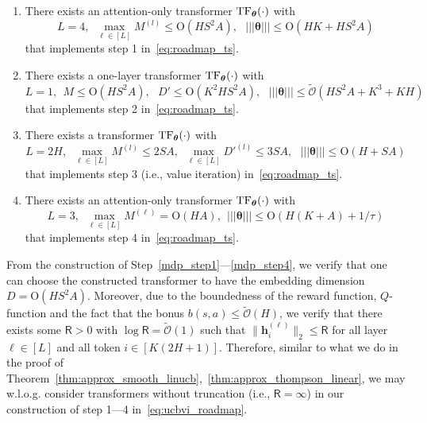 \documentclass[10pt]{article}
\newcommand{\<}{\left\langle}
\renewcommand{\>}{\right\rangle}
\newcommand{\lth}{{(\ell)}}
\newcommand{\TF}{{\rm TF}}
\newcommand{\nrmp}[1]{{\left|\!\left|\!\left|{#1}\right|\!\right|\!\right|}}
\newcommand{\temp}{{\tau}}
\newcommand{\tcO}{{\tilde{\mathcal O}}}
\newcommand{\state}{{s}}
\newcommand{\action}{{a}}
\newcommand{\Numepi}{{K}}
\newcommand{\horizon}{{H}}
\renewcommand{\horizon}{{H}}
\newcommand{\bonus}{{b}}
\newcommand{\tfpar}{{\btheta}}
\newcommand{\layer}{{L}}
\newcommand{\hidden}{{D'}}
\newcommand{\head}{{M}}
\newcommand{\clipval}{{\mathsf{R}}}
\newcommand{\Numst}{{S}}
\newcommand{\Numact}{{A}}
\newcommand{\conO}{{\mathrm{O}}}
\def\btheta{{\boldsymbol \theta}}
\def\bh{{\mathbf h}}
\begin{document}
\begin{enumerate}[label=Step \arabic*,ref= \arabic*]
    \item\label{mdp_step1}There exists an attention-only transformer $\TF_\btheta(\cdot)$ with     $$L=4,~~\max_{\ell\in[L]}M^{(l)}\leq \conO(\horizon\Numst^2\Numact),~~~ \nrmp{\btheta}\leq \conO(\horizon\Numepi+\horizon\Numst^2\Numact) $$
 that implements step 1 in~\eqref{eq:roadmap_ts}.
   \item \label{mdp_step2}
 There exists a one-layer  transformer $\TF_\btheta(\cdot)$ with
$$
L=1,~~\head\leq \conO(\horizon\Numst^2\Numact),~~~ \hidden\leq \conO(\Numepi^2\horizon\Numst^2\Numact),~~~\nrmp{\btheta}\leq \tcO(\horizon\Numst^2\Numact+\Numepi^3+\Numepi\horizon)
$$
 that implements step 2 in~\eqref{eq:roadmap_ts}.
  \item\label{mdp_step3}  There exists a transformer  $\TF_\tfpar(\cdot)$ with
    $$L=2\horizon,~~\max_{\ell\in[L]}M^{(l)}\leq 2\Numst\Numact,~~\max_{\ell\in[L]}\hidden^{(l)}\leq 3\Numst\Numact,~~~ \nrmp{\btheta}\leq  \conO(\horizon+\Numst\Numact) $$
 that implements step 3 (i.e., value iteration) in~\eqref{eq:roadmap_ts}.
  \item \label{mdp_step4}
 There exists an attention-only transformer $\TF_\btheta(\cdot)$ with
$$\layer=3,~~\max_{\ell\in[\layer]}\head^\lth=\conO(\horizon\Numact),~~\nrmp{\btheta}\leq \conO(\horizon(\Numepi+\Numact)+{1}/{\temp}) $$
 that implements step 4 in~\eqref{eq:roadmap_ts}.
\end{enumerate}
From the construction of Step~\ref{mdp_step1}---\ref{mdp_step4}, we verify that one can choose the constructed transformer to have the embedding dimension $D=\conO(\horizon\Numst^2\Numact)$. Moreover, due to the boundedness of the reward function, $Q$-function  and the fact that the bonus $\bonus(\state,\action)\leq\tcO(\horizon)$, we verify that there exists some $\clipval>0$ with $\log \clipval=\tcO(1)$ such that $\|\bh_i^{\lth}\|_2\leq \clipval$ for all layer $\ell\in[\layer]$ and all token $i\in[\Numepi(2\horizon+1)]$. Therefore, similar to what we do in the proof of Theorem~\ref{thm:approx_smooth_linucb},~\ref{thm:approx_thompson_linear}, we may w.l.o.g. consider transformers without truncation (i.e.,  $\clipval=\infty$) in our construction of step 1---4 in~\eqref{eq:ucbvi_roadmap}.
\end{document}
